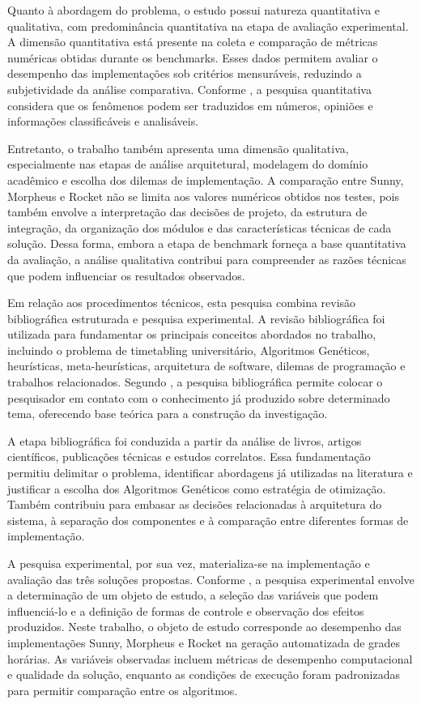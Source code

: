 Quanto à abordagem do problema, o estudo possui natureza quantitativa e qualitativa, com predominância quantitativa na etapa de avaliação experimental. A dimensão quantitativa está presente na coleta e comparação de métricas numéricas obtidas durante os benchmarks. Esses dados permitem avaliar o desempenho das implementações sob critérios mensuráveis, reduzindo a subjetividade da análise comparativa. Conforme , a pesquisa quantitativa considera que os fenômenos podem ser traduzidos em números, opiniões e informações classificáveis e analisáveis.

Entretanto, o trabalho também apresenta uma dimensão qualitativa, especialmente nas etapas de análise arquitetural, modelagem do domínio acadêmico e escolha dos dilemas de implementação. A comparação entre Sunny, Morpheus e Rocket não se limita aos valores numéricos obtidos nos testes, pois também envolve a interpretação das decisões de projeto, da estrutura de integração, da organização dos módulos e das características técnicas de cada solução. Dessa forma, embora a etapa de benchmark forneça a base quantitativa da avaliação, a análise qualitativa contribui para compreender as razões técnicas que podem influenciar os resultados observados.

Em relação aos procedimentos técnicos, esta pesquisa combina revisão bibliográfica estruturada e pesquisa experimental. A revisão bibliográfica foi utilizada para fundamentar os principais conceitos abordados no trabalho, incluindo o problema de timetabling universitário, Algoritmos Genéticos, heurísticas, meta-heurísticas, arquitetura de software, dilemas de programação e trabalhos relacionados. Segundo , a pesquisa bibliográfica permite colocar o pesquisador em contato com o conhecimento já produzido sobre determinado tema, oferecendo base teórica para a construção da investigação.

A etapa bibliográfica foi conduzida a partir da análise de livros, artigos científicos, publicações técnicas e estudos correlatos. Essa fundamentação permitiu delimitar o problema, identificar abordagens já utilizadas na literatura e justificar a escolha dos Algoritmos Genéticos como estratégia de otimização. Também contribuiu para embasar as decisões relacionadas à arquitetura do sistema, à separação dos componentes e à comparação entre diferentes formas de implementação.

A pesquisa experimental, por sua vez, materializa-se na implementação e avaliação das três soluções propostas. Conforme , a pesquisa experimental envolve a determinação de um objeto de estudo, a seleção das variáveis que podem influenciá-lo e a definição de formas de controle e observação dos efeitos produzidos. Neste trabalho, o objeto de estudo corresponde ao desempenho das implementações Sunny, Morpheus e Rocket na geração automatizada de grades horárias. As variáveis observadas incluem métricas de desempenho computacional e qualidade da solução, enquanto as condições de execução foram padronizadas para permitir comparação entre os algoritmos.

